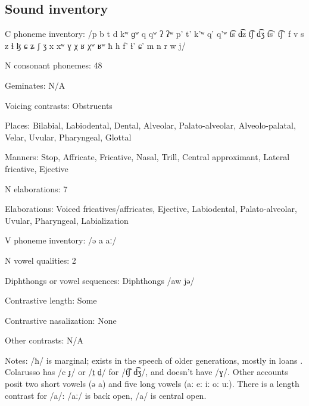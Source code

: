 {\subsection*{Sound inventory}
\begin{appendixdesc}

\item[C phoneme inventory:] /p b t d kʷ ɡʷ q qʷ ʔ ʔʷ p’ t’ k’ʷ q’ q’ʷ t͡s d͡z t͡ʃ d͡ʒ t͡s’ t͡ʃ’ f v s z ɬ ɮ ɕ ʑ ʃ ʒ x xʷ ɣ χ ʁ χʷ ʁʷ ħ h f' ɬ’ ɕ' m n r w j/

\item[N consonant phonemes:] 48

\item[Geminates:] N/A

\item[Voicing contrasts:] Obstruents

\item[Places:] Bilabial, Labiodental, Dental, Alveolar, Palato-alveolar, Alveolo-palatal, Velar, Uvular, Pharyngeal, Glottal

\item[Manners:] Stop, Affricate, Fricative, Nasal, Trill, Central approximant, Lateral fricative, Ejective

\item[N elaborations:] 7

\item[Elaborations:] Voiced fricatives/affricates, Ejective, Labiodental, Palato-alveolar, Uvular, Pharyngeal, Labialization

\item[V phoneme inventory:] /ə a aː/

\item[N vowel qualities:] 2

\item[Diphthongs or vowel sequences:] Diphthongs /aw jə/

\item[Contrastive length:] Some

\item[Contrastive nasalization:] None

\item[Other contrasts:] N/A

\item[Notes:] /ħ/ is marginal; exists in the speech of older generations, mostly in  loans \citep[10]{Matasović2010}. Colarusso has /c ɟ/ or /t̠ d̠/ for /t͡ʃ d͡ʒ/, and doesn’t have /ɣ/. Other accounts posit two short vowels (ə a) and five long vowels (aː eː iː oː uː). There is a length contrast for /a/: /aː/ is back open, /a/ is central open.
\end{appendixdesc}
}
